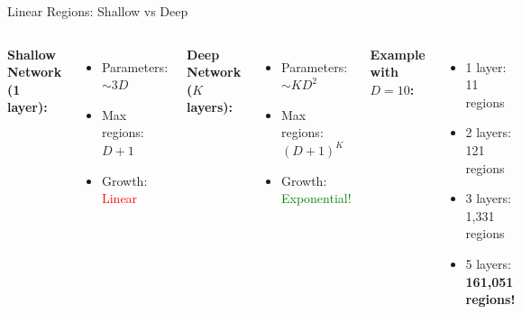 \documentclass[xcolor=svgnames, 10pt, handout, standalone]{beamer}
\newcommand{\1}{\mathbf{1}}
\begin{document}
\begin{frame}{Linear Regions: Shallow vs Deep}
\begin{columns}
\textbf{Shallow Network (1 layer):}
\begin{itemize}
    \item Parameters: $\sim 3D$
    \item Max regions: $D + 1$
    \item Growth: \textcolor{red}{Linear}
\end{itemize}

\vspace{0.5cm}

\textbf{Deep Network ($K$ layers):}
\begin{itemize}
    \item Parameters: $\sim KD^2$
    \item Max regions: $(D+1)^K$
    \item Growth: \textcolor{green}{Exponential!}
\end{itemize}

\textbf{Example with $D=10$:}
\begin{itemize}
    \item 1 layer: 11 regions
    \item 2 layers: 121 regions
    \item 3 layers: 1,331 regions
    \item 5 layers: \textbf{161,051 regions!}
\end{itemize}
\end{columns}
\end{frame}
\end{document}
